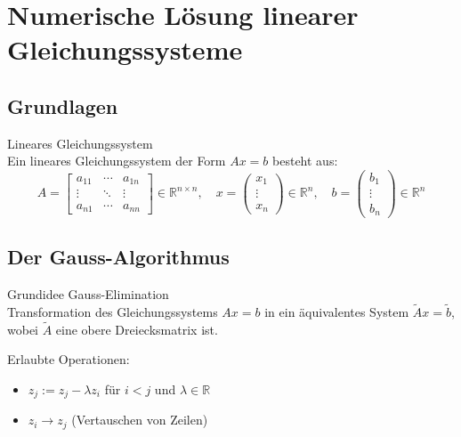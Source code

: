 \section{Numerische Lösung linearer Gleichungssysteme}

\subsection{Grundlagen}

\begin{concept}{Lineares Gleichungssystem}\\
Ein lineares Gleichungssystem der Form $Ax = b$ besteht aus:
$$A=\left[\begin{array}{ccc}
a_{11} & \cdots & a_{1n} \\
\vdots & \ddots & \vdots \\
a_{n1} & \cdots & a_{nn}
\end{array}\right] \in \mathbb{R}^{n \times n}, \quad 
x=\left(\begin{array}{c}
x_1 \\
\vdots \\
x_n
\end{array}\right) \in \mathbb{R}^n, \quad 
b=\left(\begin{array}{c}
b_1 \\
\vdots \\
b_n
\end{array}\right) \in \mathbb{R}^n$$
\end{concept}

\subsection{Der Gauss-Algorithmus}

\begin{concept}{Grundidee Gauss-Elimination}\\
Transformation des Gleichungssystems $Ax=b$ in ein äquivalentes System $\tilde{A}x=\tilde{b}$, wobei $\tilde{A}$ eine obere Dreiecksmatrix ist.

Erlaubte Operationen:
\begin{itemize}
    \item $z_j := z_j - \lambda z_i$ für $i<j$ und $\lambda \in \mathbb{R}$
    \item $z_i \rightarrow z_j$ (Vertauschen von Zeilen)
\end{itemize}
\end{concept}

